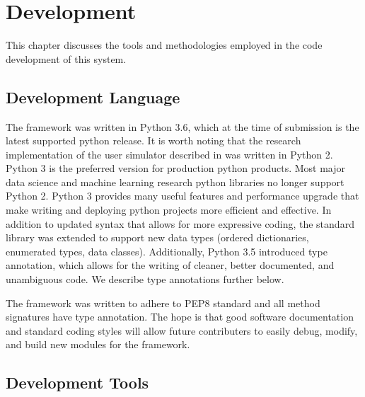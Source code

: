 \chapter{Development}
\label{chap:dev}

This chapter discusses the tools and methodologies employed in the code development of this system. 

\section{Development  Language}

The framework was written in Python 3.6, which at the time of submission is the latest supported python release. It is worth noting that the research implementation of the user simulator described in \cite{li_usersim} was written in Python 2. Python 3 is the preferred version for production python products. Most major data science and machine learning research python libraries no longer support Python 2. Python 3 provides many useful features and performance upgrade that make writing and deploying python projects more efficient and effective. In addition to updated syntax that allows for more expressive coding, the standard library was extended to support new data types (ordered dictionaries, enumerated types, data classes). Additionally, Python 3.5 introduced type annotation, which allows for the writing of cleaner, better documented, and unambiguous code. We describe type annotations further below.

The framework was written to adhere to PEP8 standard and all method signatures have type annotation. The hope is that good software documentation and standard coding styles will allow future contributers to easily debug, modify, and build new modules for the framework. 

\section{Development  Tools}


